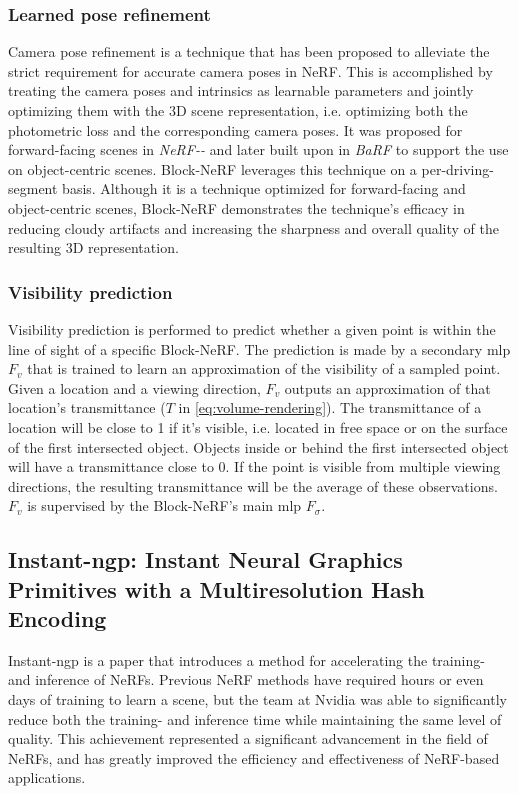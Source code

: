 \subsubsection{Learned pose refinement} \label{sec:camera-pose-refinement}
Camera pose refinement is a technique that has been proposed to alleviate the strict requirement for accurate camera poses in NeRF. This is accomplished by treating the camera poses and intrinsics as learnable parameters and jointly optimizing them with the 3D scene representation, i.e. optimizing both the photometric loss and the corresponding camera poses. It was proposed for forward-facing scenes in \textit{NeRF\nobreakdash-\nobreakdash-} \cite{wang_nerf--_2022} and later built upon in \textit{BaRF} \cite{lin_barf_2021} to support the use on object-centric scenes. Block-NeRF leverages this technique on a per-driving-segment basis. Although it is a technique optimized for forward-facing and object-centric scenes, Block-NeRF demonstrates the technique's efficacy in reducing cloudy artifacts and increasing the sharpness and overall quality of the resulting 3D representation.


\subsubsection{Visibility prediction} \label{sec:visibility-prediction}
Visibility prediction is performed to predict whether a given point is within the line of sight of a specific Block-NeRF. The prediction is made by a secondary \acrshort{mlp} $F_v$ that is trained to learn an approximation of the visibility of a sampled point. Given a location and a viewing direction, $F_v$ outputs an approximation of that location's transmittance ($T$ in \autoref{eq:volume-rendering}). The transmittance of a location will be close to 1 if it's visible, i.e. located in free space or on the surface of the first intersected object. Objects inside or behind the first intersected object will have a transmittance close to 0. If the point is visible from multiple viewing directions, the resulting transmittance will be the average of these observations. $F_v$ is supervised by the Block-NeRF's main \acrshort{mlp} $F_\sigma$.



\subsection[Instant-ngp]{Instant-ngp: Instant Neural Graphics Primitives with a Multiresolution Hash Encoding} \label{sec:instant-ngp}
Instant-ngp \cite{muller_instant_2022} is a paper that introduces a method for accelerating the training- and inference of NeRFs. Previous NeRF methods have required hours or even days of training to learn a scene, but the team at Nvidia was able to significantly reduce both the training- and inference time while maintaining the same level of quality. This achievement represented a significant advancement in the field of NeRFs, and has greatly improved the efficiency and effectiveness of NeRF-based applications.

